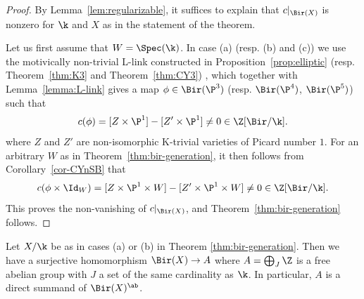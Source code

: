 \begin{proof}
By Lemma~\ref{lem:regularizable},
it suffices
to explain that $c|_{\Bir(X)}$ is nonzero
for $\k$ and $X$ as in
the statement of the theorem.

Let us first assume that $W = \Spec(\k)$.
In case (a) (resp. (b) and (c)) we
use the motivically non-trivial L-link constructed in Proposition~\ref{prop:elliptic}
(resp. Theorem~\ref{thm:K3} and Theorem~\ref{thm:CY3}) ,
which together with
Lemma~\ref{lemma:L-link} gives a map $\phi \in \Bir(\P^3)$
(resp. $\Bir(\P^4)$, $\Bir(\P^5)$)
such that
$$c(\phi) = [Z \times \P^1] - [Z' \times \P^1] \ne 0 \in \Z[\Bir/\k].$$
where $Z$ and $Z'$ are non-isomorphic
K-trivial
varieties of Picard number $1$.
For an arbitrary $W$ as in Theorem~\ref{thm:bir-generation},
it then follows from Corollary~\ref{cor-CYnSB}
that
$$c(\phi \times \Id_W) = [Z \times \P^1 \times W] - [Z' \times \P^1 \times W]
\ne 0 \in \Z[\Bir/\k].$$
This proves the non-vanishing of $c|_{\Bir(X)}$, and Theorem~\ref{thm:bir-generation} follows.
\end{proof}




\begin{corollary}
\notready\label{cor:homZ}
Let $X/\k$ be as in cases (a) or (b) in Theorem \ref{thm:bir-generation}.
Then we have a surjective homomorphism
$
\Bir(X) \to A
$
where $A = \bigoplus_J \Z$
is a free abelian group
with $J$ a set
of the same cardinality as $\k$.
In particular, $A$ is a direct summand
of $\Bir(X)^{\ab}$.
\end{corollary}


